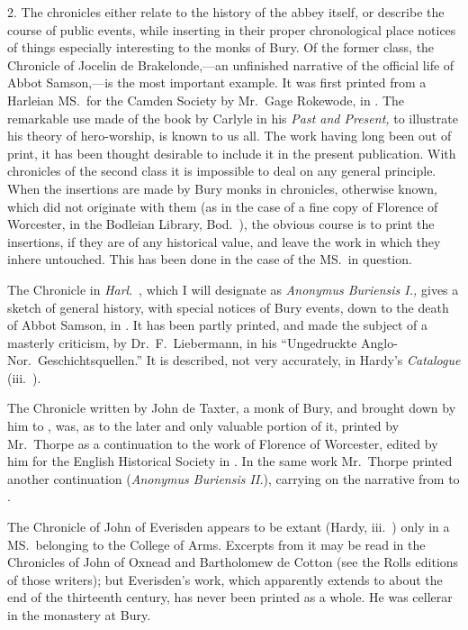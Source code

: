 \documentclass[10pt]{book}
\begin{document}
{2. The chronicles either relate to the history of the abbey itself, or describe the course of public events, while inserting in their proper chronological place notices of things especially interesting to the monks of Bury. Of the former class, the Chronicle of Jocelin de Brakelonde,---an unfinished narrative of the official life of Abbot Samson,---is the most important example. It was first printed from a Harleian MS.\ for the Camden Society by Mr.\ Gage Rokewode, in . The remarkable use made of the book by Carlyle in his \emph{Past and Present,} to illustrate his theory of hero-worship, is known to us all. The work having long been out of print, it has been thought desirable to include it in the present publication. With chronicles of the second class it is impossible to deal on any general principle. When the insertions are made by Bury monks in chronicles, otherwise known, which did not originate with them (as in the case of a fine copy of Florence of Worcester, in the Bodleian Library, Bod.\ ), the obvious course is to print the insertions, if they are of any historical value, and leave the work in which they inhere untouched. This has been done in the case of the MS.\ in question.

The Chronicle in \emph{Harl}.\ , which I will designate as \emph{Anonymus Buriensis I.,} gives a sketch of general history, with special notices of Bury events, down to the death of Abbot Samson, in . It has been partly printed, and made the subject of a masterly criticism, by Dr.\ F.\ Liebermann, in his ``Ungedruckte Anglo-Nor.\ Geschichtsquellen.'' It is described, not very accurately, in Hardy's \emph{Catalogue} (iii.\ ).

The Chronicle written by John de Taxter, a monk of Bury, and brought down by him to , was, as to the later and only valuable portion of it, printed by Mr.\ Thorpe as a continuation to the work of Florence of Worcester, edited by him for the English Historical Society in . In the same work Mr.\ Thorpe printed another continuation (\emph{Anonymus Buriensis II.}), carrying on the narrative from  to .

The Chronicle of John of Everisden appears to be extant (Hardy, iii.\ ) only in a MS.\ belonging to the College of Arms. Excerpts from it may be read in the Chronicles of John of Oxnead and Bartholomew de Cotton (see the Rolls editions of those writers); but Everisden's work, which apparently extends to about the end of the thirteenth century, has never been printed as a whole. He was cellerar in the monastery at Bury.

}
\end{document}
